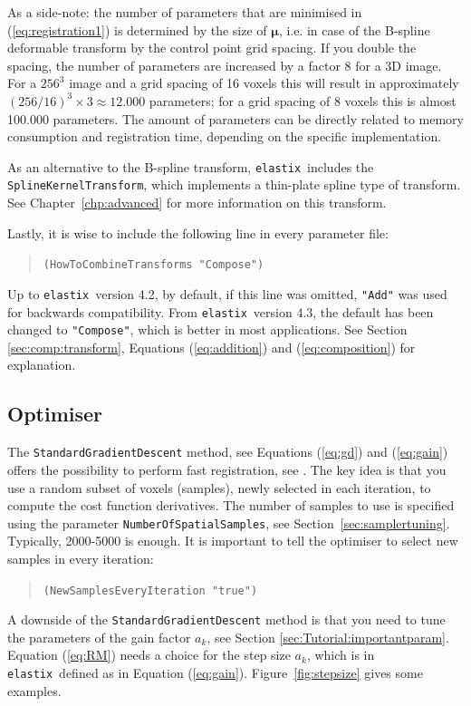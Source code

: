\documentclass[]{report}
\newcommand{\elastix}{\texttt{elastix}}
\newcommand{\vmu}{\bm{\mu}}
\begin{document}
As a side-note: the number of parameters that are minimised in
(\ref{eq:registration1}) is determined by the size of $\vmu$, i.e.
in case of the B-spline deformable transform by the control point
grid spacing. If you double the spacing, the number of parameters
are increased by a factor 8 for a 3D image. For a $256^3$ image and
a grid spacing of 16 voxels this will result in approximately
$(256/16)^3 \times 3 \approx 12.000$ parameters; for a grid spacing
of 8 voxels this is almost 100.000 parameters. The amount of
parameters can be directly related to memory consumption and
registration time, depending on the specific implementation.

As an alternative to the B-spline transform, \elastix\ includes the
\texttt{SplineKernelTransform}, which implements a thin-plate spline type of
transform. See Chapter~\ref{chp:advanced} for more information on this
transform.

Lastly, it is wise to include the following line in every
parameter file:
\begin{quote}
  \texttt{(HowToCombineTransforms "Compose")}
\end{quote}
Up to \elastix\ version 4.2, by default, if this line was omitted,
\texttt{"Add"} was used for backwards compatibility. From \elastix\ version
4.3, the default has been changed to \texttt{"Compose"}, which is better in
most applications. See Section \ref{sec:comp:transform}, Equations
(\ref{eq:addition}) and (\ref{eq:composition}) for explanation.

\subsection{Optimiser}\label{sec:optimizertuning}

The \texttt{StandardGradientDescent} method, see Equations
(\ref{eq:gd}) and (\ref{eq:gain}) offers the possibility to
perform fast registration, see \cite{KleinEA07}. The key idea is
that you use a random subset of voxels (samples), newly selected
in each iteration, to compute the cost function derivatives. The
number of samples to use is specified using the parameter
\texttt{NumberOfSpatialSamples}, see
Section~\ref{sec:samplertuning}. Typically, 2000-5000 is enough.
It is important to tell the optimiser to select new samples in
every iteration:
\begin{quote}
  \texttt{(NewSamplesEveryIteration "true")}
\end{quote}

A downside of the \texttt{StandardGradientDescent} method is that
you need to tune the parameters of the gain factor $a_k$, see
Section \ref{sec:Tutorial:importantparam}. Equation (\ref{eq:RM})
needs a choice for the step size $a_k$, which is in \elastix\
defined as in Equation (\ref{eq:gain}). Figure~\ref{fig:stepsize}
gives some examples.
\end{document}
